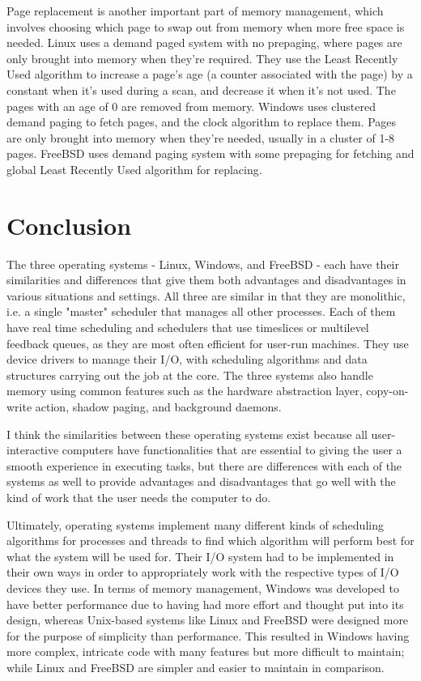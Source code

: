 \documentclass[10pt,draftclsnofoot,onecolumn,letterpaper]{IEEEtran}
\begin{document}
Page replacement is another important part of memory management, which involves choosing which page to swap out from memory when more free space is needed. Linux uses a demand paged system with no prepaging, where pages are only brought into memory when they're required\cite{16}. They use the Least Recently Used algorithm to increase a page's age (a counter associated with the page) by a constant when it's used during a scan, and decrease it when it's not used. The pages with an age of 0 are removed from memory\cite{15}. Windows uses clustered demand paging to fetch pages, and the clock algorithm to replace them. Pages are only brought into memory when they're needed, usually in a cluster of 1-8 pages. FreeBSD uses demand paging system with some prepaging for fetching and global Least Recently Used algorithm for replacing\cite{15}. \par


\section{Conclusion}

The three operating systems - Linux, Windows, and FreeBSD - each have their similarities and differences that give them both advantages and disadvantages in various situations and settings. All three are similar in that they are monolithic, i.e. a single "master" scheduler that manages all other processes. Each of them have real time scheduling and schedulers that use timeslices or multilevel feedback queues, as they are most often efficient for user-run machines. They use device drivers to manage their I/O, with scheduling algorithms and data structures carrying out the job at the core. The three systems also handle memory using common features such as the hardware abstraction layer, copy-on-write action, shadow paging, and background daemons. \par
I think the similarities between these operating systems exist because all user-interactive computers have functionalities that are essential to giving the user a smooth experience in executing tasks, but there are differences with each of the systems as well to provide advantages and disadvantages that go well with the kind of work that the user needs the computer to do. \par
Ultimately, operating systems implement many different kinds of scheduling algorithms for processes and threads to find which algorithm will perform best for what the system will be used for. Their I/O system had to be implemented in their own ways in order to appropriately work with the respective types of I/O devices they use. In terms of memory management, Windows was developed to have better performance due to having had more effort and thought put into its design, whereas Unix-based systems like Linux and FreeBSD were designed more for the purpose of simplicity than performance. This resulted in Windows having more complex, intricate code with many features but more difficult to maintain; while Linux and FreeBSD are simpler and easier to maintain in comparison. \par



{}
\end{document}
